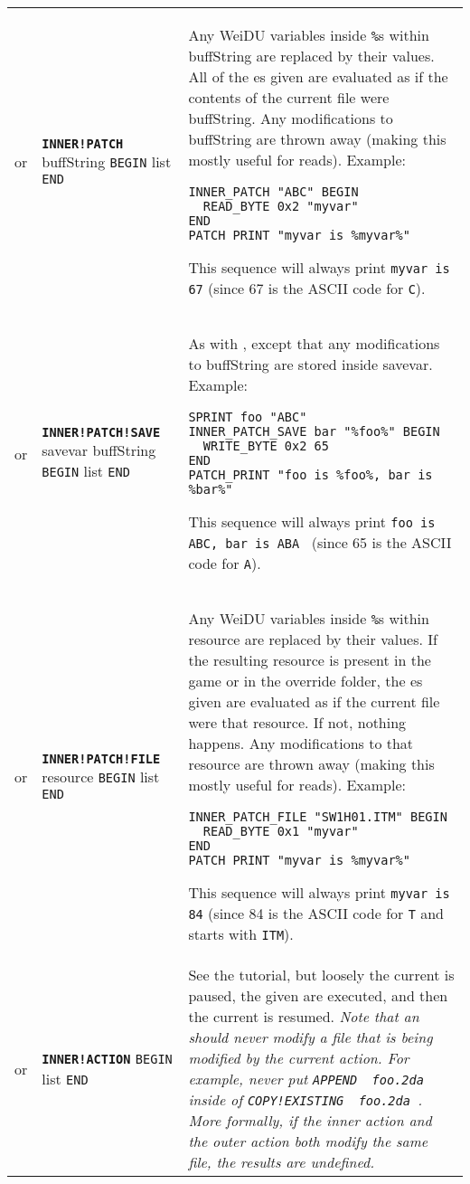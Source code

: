 \documentclass{article}
\def\ttref#1{\ahrefloc{#1}{\tt #1}}
\def\DEFINE#1{{\tt \bf #1}\label{#1}\index{#1}}
\def\DEFSYN#1{{\tt \bf #1}\index{#1}}
\def\t#1{{\tt #1}}
\def\Slist{{\color{red} list }}
\begin{document}
\begin{tabular}{cp{10in}|p{10in}}
or & \DEFINE{INNER!PATCH} buffString \t{BEGIN} \ttref{patch} \Slist \t{END} &
  Any WeiDU variables inside \t{\%}s within buffString are replaced by
  their values. All of the \ttref{patch}es given are evaluated as if the
  contents of the current file were buffString. Any modifications to
  buffString are thrown away (making this mostly useful for reads).
  Example:
\begin{verbatim}
INNER_PATCH "ABC" BEGIN
  READ_BYTE 0x2 "myvar"
END
PATCH_PRINT "myvar is %myvar%"
\end{verbatim}
  This sequence will always print \t{myvar is 67} (since 67 is the ASCII
  code for \t{C}). \\

or & \DEFINE{INNER!PATCH!SAVE} savevar buffString \t{BEGIN} \ttref{patch} \Slist \t{END} &
  As with \ttref{INNER!PATCH}, except that any modifications to buffString are stored inside
  savevar.
  Example:
\begin{verbatim}
SPRINT foo "ABC"
INNER_PATCH_SAVE bar "%foo%" BEGIN
  WRITE_BYTE 0x2 65
END
PATCH_PRINT "foo is %foo%, bar is %bar%"
\end{verbatim}
  This sequence will always print \t{foo is ABC, bar is ABA } (since 65 is the ASCII
  code for \t{A}). \\


or & \DEFINE{INNER!PATCH!FILE} resource \t{BEGIN} \ttref{patch} \Slist \t{END} &
  Any WeiDU variables inside \t{\%}s within resource are replaced by
  their values. If the resulting resource is present in the game or in the
  override folder, the \ttref{patch}es given are evaluated as if the
  current file were that resource. If not, nothing happens. Any
  modifications to that resource are thrown away (making this mostly useful
  for reads).
  Example:
\begin{verbatim}
INNER_PATCH_FILE "SW1H01.ITM" BEGIN
  READ_BYTE 0x1 "myvar"
END
PATCH_PRINT "myvar is %myvar%"
\end{verbatim}
  This sequence will always print \t{myvar is 84} (since 84 is the ASCII
  code for \t{T} and \ttref{SW1H01.ITM} starts with \t{ITM}). \\

or & \DEFSYN{INNER!ACTION} \t{BEGIN} \ttref{TP2 Action} \Slist \t{END} &
  See the \ttref{INNER!ACTION} tutorial, but loosely the current
  \ttref{COPY} is paused, the given \ttref{TP2 Actions} are executed, and
  then the current \ttref{COPY} is resumed. \emph{Note that an
  \ttref{INNER!ACTION} should never modify a file that is being modified by
  the current action. For example, never put \t{APPEND ~foo.2da~} inside of
  \t{COPY!EXISTING ~foo.2da~}. More formally, if the inner action and the
  outer action both modify the same file, the results are undefined.}\\


\end{tabular}
\end{document}
